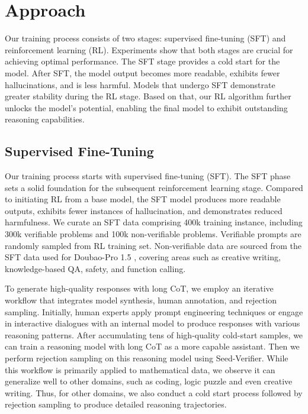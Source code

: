 \section{Approach}
Our training process consists of two stages: supervised fine-tuning (SFT) and reinforcement learning (RL). Experiments show that both stages are crucial for achieving optimal performance. The SFT stage provides a cold start for the model. After SFT, the model output becomes more readable, exhibits fewer hallucinations, and is less harmful. Models that undergo SFT demonstrate greater stability during the RL stage. Based on that,  our RL algorithm further unlocks the model's potential, enabling the final model to exhibit outstanding reasoning capabilities.

\subsection{Supervised Fine-Tuning}

Our training process starts with supervised fine-tuning (SFT). The SFT phase sets a solid foundation for the subsequent reinforcement learning stage. Compared to initiating RL from a base model, the SFT model produces more readable outputs, exhibits fewer instances of hallucination, and demonstrates reduced harmfulness. We curate an SFT data comprising 400k training instance, including 300k verifiable problems and 100k non-verifiable problems. Verifiable prompts are randomly sampled from RL training set. Non-verifiable data are sourced from the SFT data used for Doubao-Pro 1.5 \cite{doubao1.5pro}, covering areas such as creative writing, knowledge-based QA, safety, and function calling.

To generate high-quality responses with long CoT, we employ an iterative workflow that integrates model synthesis, human annotation, and rejection sampling. Initially, human experts apply prompt engineering techniques or engage in interactive dialogues with an internal model to produce responses with various reasoning patterns. After accumulating tens of high-quality cold-start samples, we can train a reasoning model with long CoT as a more capable assistant. Then we perform rejection sampling on this reasoning model using Seed-Verifier. While this workflow is primarily applied to mathematical data, we observe it can generalize well to other domains, such as coding, logic puzzle and even creative writing. Thus, for other domains, we also conduct a cold start process followed by rejection sampling to produce detailed reasoning trajectories.

